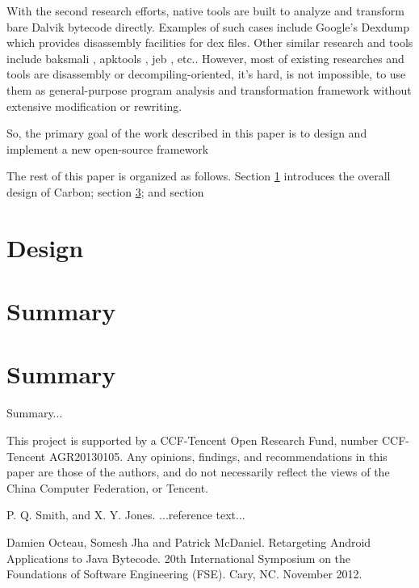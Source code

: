 \documentclass[10pt, preprint, cm]{sigplanconf}
\begin{document}
With the second research efforts, native tools are built to
analyze and transform bare Dalvik bytecode directly. Examples of
such cases include Google's
Dexdump which provides disassembly facilities for dex files. Other similar research
and tools 
include baksmali \cite{}, apktools \cite{}, jeb \cite{}, etc.. However, most of
existing researches and tools are disassembly or decompiling-oriented, 
it's hard, is not impossible, to use them as general-purpose
program analysis and transformation framework without extensive
modification or rewriting.

So, the primary goal of the work described in this paper is to design
and implement a new open-source framework 




The rest of this paper is organized as follows. Section \ref{sec-design}
introduces the overall design of Carbon; section \ref{}; and section
\

\section{Design}\label{sec-design}

\section{}

\section{Summary}


\section{Summary}\label{sec-summary}

Summary...

\acks

This project is supported by a CCF-Tencent
Open Research Fund, number CCF-Tencent AGR20130105. Any
opinions, findings, and recommendations in this paper are those
of the authors, and do not
necessarily reflect the views of the China Computer Federation, or
Tencent.





\begin{thebibliography}{}
\softraggedright

P. Q. Smith, and X. Y. Jones. ...reference text...

Damien Octeau, Somesh Jha and Patrick McDaniel. Retargeting 
Android Applications to Java Bytecode. 20th International 
Symposium on the Foundations of Software Engineering (FSE). Cary, NC. November 2012.

\end{thebibliography}
\end{document}
